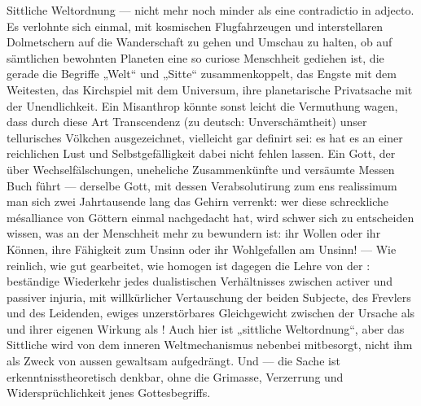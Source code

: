 Sittliche Weltordnung — nicht mehr noch minder als eine contradictio in adjecto. Es verlohnte sich einmal, mit kosmischen Flugfahrzeugen und interstellaren Dolmetschern auf die Wanderschaft zu gehen und Umschau zu halten, ob auf sämtlichen bewohnten Planeten eine so curiose Menschheit gediehen ist, die gerade die Begriffe „Welt“ und „Sitte“ zusammenkoppelt, das Engste mit dem Weitesten, das Kirchspiel mit dem Universum, ihre planetarische Privatsache mit der Unendlichkeit. Ein Misanthrop könnte sonst leicht die Vermuthung wagen, dass durch diese Art Transcendenz (zu deutsch: Unverschämtheit) unser tellurisches Völkchen ausgezeichnet, vielleicht gar definirt sei: es hat es an einer reichlichen Lust und Selbstgefälligkeit dabei nicht fehlen lassen. Ein Gott, der über Wechselfälschungen, uneheliche Zusammenkünfte und versäumte Messen Buch führt — derselbe Gott, mit dessen Verabsolutirung zum ens realissimum man sich zwei Jahrtausende lang das Gehirn verrenkt: wer diese schreckliche mésalliance von Göttern einmal nachgedacht hat, wird schwer sich zu entscheiden wissen, was an der Menschheit mehr zu bewundern ist: ihr Wollen oder ihr Können, ihre Fähigkeit zum Unsinn oder ihr Wohlgefallen am Unsinn! — Wie reinlich, wie gut gearbeitet, wie homogen ist dagegen die Lehre von der : beständige Wiederkehr jedes dualistischen Verhältnisses zwischen activer und passiver injuria, mit willkürlicher Vertauschung der beiden Subjecte, des Frevlers und des Leidenden, ewiges unzerstörbares Gleichgewicht zwischen der Ursache als  und ihrer eigenen Wirkung als ! Auch hier ist „sittliche Weltordnung“, aber das Sittliche wird von dem inneren Weltmechanismus nebenbei mitbesorgt, nicht ihm als Zweck von aussen gewaltsam aufgedrängt. Und — die Sache ist erkenntnisstheoretisch denkbar, ohne die Grimasse, Verzerrung und Widersprüchlichkeit jenes Gottesbegriffs.
\par

